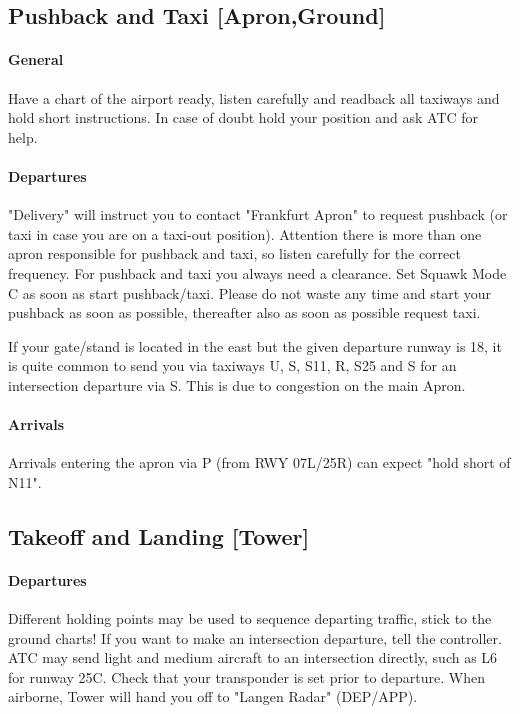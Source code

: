 \subsection[GND]{Pushback and Taxi [Apron,Ground]}
\paragraph{General}
Have a chart of the airport ready, listen carefully and readback all taxiways and hold short instructions. In case of doubt hold your position and ask ATC for help.

\paragraph{Departures}
"Delivery" will instruct you to contact "Frankfurt Apron" to request pushback (or taxi in case you are on a taxi-out position). Attention there is more than one apron responsible for pushback and taxi, so listen carefully for the correct frequency.
For pushback and taxi you always need a clearance.
Set Squawk Mode C as soon as start pushback/taxi.
Please do not waste any time and start your pushback as soon as possible, thereafter also as soon as possible request taxi.

If your gate/stand is located in the east but the given departure runway is 18, it is quite common to send
you via taxiways U, S, S11, R, S25 and S for an intersection departure via S. This is due to congestion on the main Apron.

\paragraph{Arrivals}
Arrivals entering the apron via P (from RWY 07L/25R) can expect "hold short of N11".

\subsection[TWR]{Takeoff and Landing [Tower]}

\paragraph{Departures}
Different holding points may be used to sequence departing traffic, stick to the ground charts!
If you want to make an intersection departure, tell the controller. ATC may send light and medium
aircraft to an intersection directly, such as L6 for runway 25C.
Check that your transponder is set prior to departure.
When airborne, Tower will hand you off to "Langen Radar" (DEP/APP).

